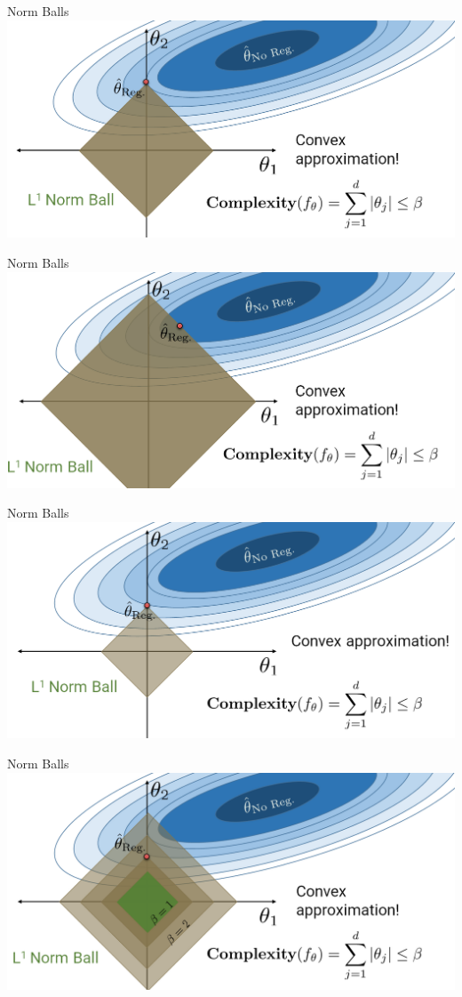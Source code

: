 \documentclass[aspectratio=169]{../latex_main/tntbeamer}  %
\begin{document}
	\begin{frame}{Norm Balls}
	    \includegraphics[scale=.35]{Bild8}
	\end{frame}
	
	\begin{frame}{Norm Balls}
	    \includegraphics[scale=.35]{Bild9}
	\end{frame}
	
	
	\begin{frame}{Norm Balls}
	    \includegraphics[scale=.35]{Bild10}
	\end{frame}
	
	\begin{frame}{Norm Balls}
	    \includegraphics[scale=.35]{Bild11}
	\end{frame}
	
\end{document}
